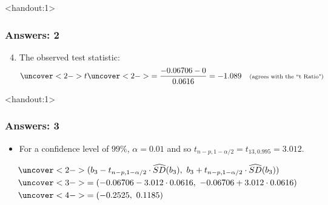 \documentclass[handout]{beamer}\usepackage[]{graphicx}\usepackage[]{color}
\newcommand{\answers}{1}
\providecommand{\wh}[1]{\widehat{#1}}
\numberwithin{equation}{section}
\begin{document}
\begin{frame}<handout:\answers>
\frametitle{Answers: 2} \small
\begin{enumerate}
\setcounter{enumi}{3}
\item The observed test statistic:
\begin{align*}
\uncover<2->{t} & \uncover<2->{= \frac{-0.06706 - 0}{0.0616} = -1.089 \quad \text{\scriptsize (agrees with the ``t Ratio")}} \\
\end{align*}
\end{enumerate}
\end{frame}


\begin{frame}<handout:\answers>
\frametitle{Answers: 3} \small
\begin{itemize}
\item For a confidence level of $99\%$, $\alpha = 0.01$ and so $t_{n - p, 1 - \alpha/2} = t_{13, 0.995} = 3.012$.
\end{itemize}
\begin{align*}
&\uncover<2->{(b_3 - t_{n - p, 1 - \alpha/2} \cdot \wh{SD}(b_3), \ b_3 + t_{n - p, 1 - \alpha/2}\cdot \wh{SD}(b_3))} \\
&\uncover<3->{=  (-0.06706 - 3.012 \cdot 0.0616, \ -0.06706 + 3.012 \cdot 0.0616)} \\
&\uncover<4->{= (-0.2525, \ 0.1185)}
\end{align*}
\begin{itemize}
\end{itemize}
\end{frame}
\end{document}
